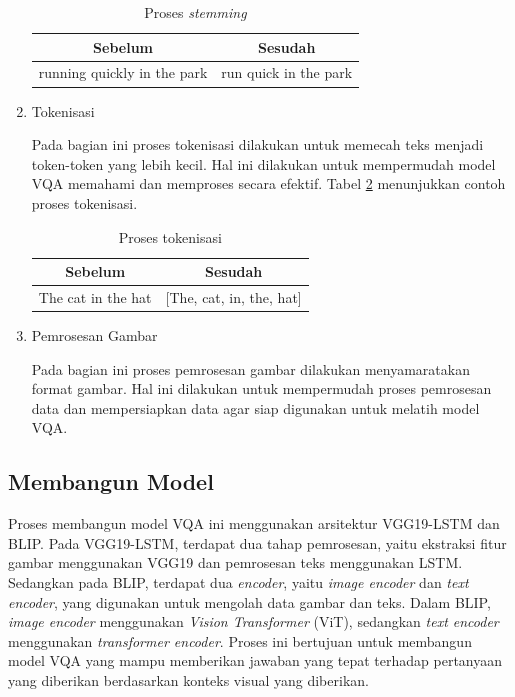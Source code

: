 \begin{enumerate}
\begin{table}[H]
    \centering
    \caption{Proses \textit{stemming}}
    \label{tab:stemming-text}
    \begin{tabular}{|l|l|}
    \hline
    \multicolumn{1}{|c|}{\textbf{Sebelum}} & \multicolumn{1}{c|}{\textbf{Sesudah}} \\ \hline
    running quickly in the park            & run quick in the park                 \\ \hline
    \end{tabular}
\end{table}

\item{Tokenisasi}

\par Pada bagian ini proses tokenisasi dilakukan untuk memecah teks menjadi token-token yang lebih kecil. Hal ini dilakukan untuk mempermudah model VQA memahami dan memproses secara efektif. Tabel \ref{tab:tokenisasi} menunjukkan contoh proses tokenisasi.

\begin{table}[H]
    \centering
    \caption{Proses tokenisasi}
    \label{tab:tokenisasi}
    \begin{tabular}{|l|l|}
    \hline
    \multicolumn{1}{|c|}{\textbf{Sebelum}} & \multicolumn{1}{c|}{\textbf{Sesudah}}  \\ \hline
    The cat in the hat                     & {[}The, cat, in, the, hat{]} \\ \hline
    \end{tabular}
\end{table}

\item{Pemrosesan Gambar}

\par Pada bagian ini proses pemrosesan gambar dilakukan menyamaratakan format gambar. Hal ini dilakukan untuk mempermudah proses pemrosesan data dan mempersiapkan data agar siap digunakan untuk melatih model VQA.


\end{enumerate}

\subsection{Membangun Model}

\par Proses membangun model VQA ini menggunakan arsitektur VGG19-LSTM dan BLIP. Pada VGG19-LSTM, terdapat dua tahap pemrosesan, yaitu ekstraksi fitur gambar menggunakan VGG19 dan pemrosesan teks menggunakan LSTM. Sedangkan pada BLIP, terdapat dua \textit{encoder}, yaitu \textit{image encoder} dan \textit{text encoder}, yang digunakan untuk mengolah data gambar dan teks. Dalam BLIP, \textit{image encoder} menggunakan \textit{Vision Transformer} (ViT), sedangkan \textit{text encoder} menggunakan \textit{transformer encoder}. Proses ini bertujuan untuk membangun model VQA yang mampu memberikan jawaban yang tepat terhadap pertanyaan yang diberikan berdasarkan konteks visual yang diberikan.




